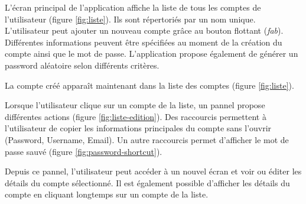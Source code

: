 L'écran principal de l'application affiche la liste de tous les comptes de l'utilisateur (figure \ref{fig:liste}). Ils sont répertoriés par un nom unique. L'utilisateur peut ajouter un nouveau compte grâce au bouton flottant (\emph{fab}). Différentes informations peuvent être spécifiées au moment de la création du compte ainsi que le mot de passe. L'application \easypass{} propose également de générer un password aléatoire selon différents critères. 

\begin{center}
	\begin{minipage}{.3\textwidth}
	\end{minipage}
	\begin{minipage}{.3\textwidth}
	\end{minipage}
	\begin{minipage}{.3\textwidth}
	\end{minipage}        
\end{center}

La compte créé apparaît maintenant dans la liste des comptes (figure \ref{fig:liste}). 

Lorsque l'utilisateur clique sur un compte de la liste, un pannel propose différentes actions (figure \ref{fig:liste-edition}). Des raccourcis permettent à l'utilisateur de copier les informations principales du compte sans l'ouvrir (Password, Username, Email). Un autre raccourcis permet d'afficher le mot de passe sauvé (figure \ref{fig:password-shortcut}). 

Depuis ce pannel, l'utilisateur peut accéder à un nouvel écran et voir ou éditer les détails du compte sélectionné. Il est également possible d'afficher les détails du compte en cliquant longtemps sur un compte de la liste.

\begin{center}
	\begin{minipage}{.3\textwidth}
	\end{minipage}
	\begin{minipage}{.3\textwidth}
	\end{minipage}
	\begin{minipage}{.3\textwidth}
	\end{minipage}        
\end{center}



